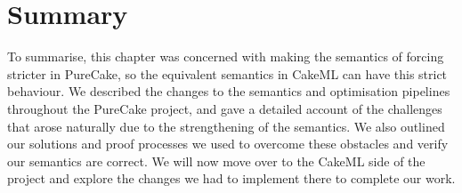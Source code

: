 \section{Summary}

To summarise, this chapter was concerned with making the semantics of forcing
stricter in PureCake, so the equivalent semantics in CakeML can have this strict
behaviour. We described the changes to the semantics and optimisation pipelines
throughout the PureCake project, and gave a detailed account of the challenges
that arose naturally due to the strengthening of the semantics. We also outlined
our solutions and proof processes we used to overcome these obstacles and verify
our semantics are correct. We will now move over to the CakeML side of the
project and explore the changes we had to implement there to complete our work.
